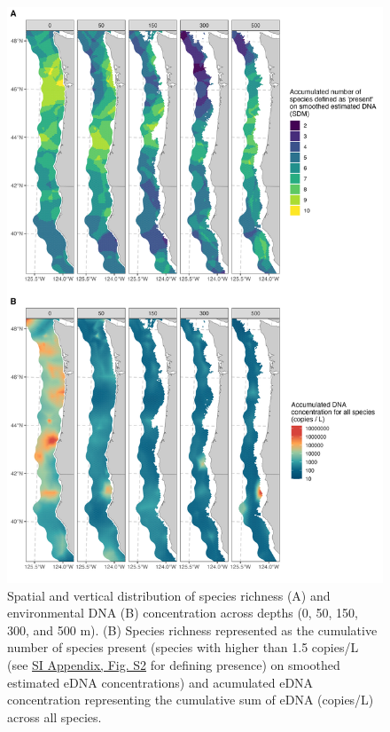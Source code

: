 \documentclass{article}
\begin{document}
\begin{figure}[tbhp]  
\centering
\includegraphics[width=13cm]{plots/3_Figure_3.jpg}  
\caption{Spatial and vertical distribution of species richness (A) and environmental DNA (B) concentration across depths (0, 50, 150, 300, and 500 m). (B) Species richness represented as the cumulative number of species present (species with higher than 1.5 copies/L (see \href{SI_Appendix.pdf}{SI Appendix, Fig. S2} for defining presence) on smoothed estimated eDNA concentrations) and acumulated eDNA concentration representing the cumulative sum of eDNA (copies/L) across all species.}
\label{fig:fig3}
\end{figure}

\end{document}
